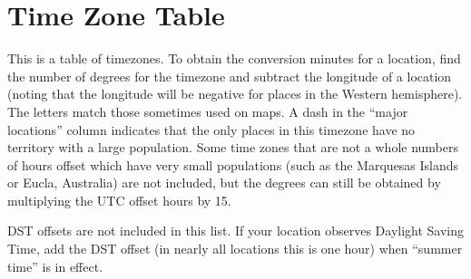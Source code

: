 \section{Time Zone Table}

This is a table of timezones. To obtain the conversion minutes for a location, find the number of degrees for the timezone and subtract the longitude of a location (noting that the longitude will be negative for places in the Western hemisphere). The letters match those sometimes used on maps. A dash in the “major locations” column indicates that the only places in this timezone have no territory with a large population. Some time zones that are not a whole numbers of hours offset which have very small populations (such as the Marquesas Islands or Eucla, Australia) are not included, but the degrees can still be obtained by multiplying the UTC offset hours by 15.

DST offsets are not included in this list.  If your location observes Daylight Saving Time, add the DST offset (in nearly all locations this is one hour) when “summer time” is in effect.

